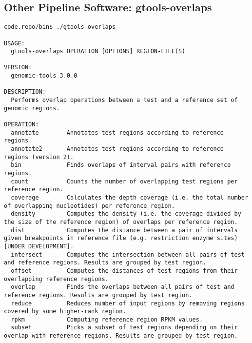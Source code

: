 \subsection[gtools-overlaps]{Other Pipeline Software: gtools-overlaps}\label{gtools-overlaps}%
% 
\begin{lstlisting}
code.repo/bin$ ./gtools-overlaps

USAGE:
  gtools-overlaps OPERATION [OPTIONS] REGION-FILE(S)

VERSION:
  genomic-tools 3.0.0

DESCRIPTION:
  Performs overlap operations between a test and a reference set of genomic regions.

OPERATION:
  annotate        Annotates test regions according to reference regions.
  annotate2       Annotates test regions according to reference regions (version 2).
  bin             Finds overlaps of interval pairs with reference regions.
  count           Counts the number of overlapping test regions per reference region.
  coverage        Calculates the depth coverage (i.e. the total number of overlapping nucleotides) per reference region.
  density         Computes the density (i.e. the coverage divided by the size of the reference region) of overlaps per reference region.
  dist            Computes the distance between a pair of intervals given breakpoints in reference file (e.g. restriction enzyme sites) [UNDER DEVELOPMENT].
  intersect       Computes the intersection between all pairs of test and reference regions. Results are grouped by test region.
  offset          Computes the distances of test regions from their overlapping reference regions.
  overlap         Finds the overlaps between all pairs of test and reference regions. Results are grouped by test region.
  reduce          Reduces number of input regions by removing regions covered by some higher-rank region.
  rpkm            Computing reference region RPKM values.
  subset          Picks a subset of test regions depending on their overlap with reference regions. Results are grouped by test region.
\end{lstlisting}
%
